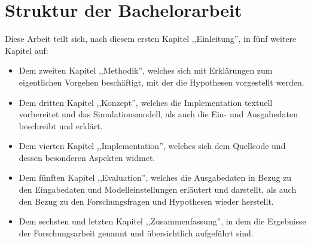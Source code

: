 %
%
\section{Struktur der Bachelorarbeit}\label{sec:struktur-der-bachelorarbeit}

Diese Arbeit teilt sich, nach diesem ersten Kapitel ,,Einleitung'', in fünf weitere Kapitel auf:

\begin{itemize}

    \item Dem zweiten Kapitel ,,Methodik'', welches sich mit Erklärungen zum eigentlichen Vorgehen beschäftigt, mit der die Hypothesen vorgestellt werden.
    \item Dem dritten Kapitel ,,Konzept'', welches die Implementation textuell vorbereitet und das Simulationsmodell, als auch die Ein- und Ausgabedaten beschreibt und erklärt.
    \item Dem vierten Kapitel ,,Implementation'', welches sich dem Quellcode und dessen besonderen Aspekten widmet.
    \item Dem fünften Kapitel ,,Evaluation'', welches die Ausgabedaten in Bezug zu den Eingabedaten und Modelleinstellungen erläutert und darstellt, als auch den Bezug zu den Forschungsfragen und Hypothesen wieder herstellt.
    \item Dem sechsten und letzten Kapitel ,,Zusammenfassung'', in dem die Ergebnisse der Forschungsarbeit genannt und übersichtlich aufgeführt sind.

\end{itemize}
